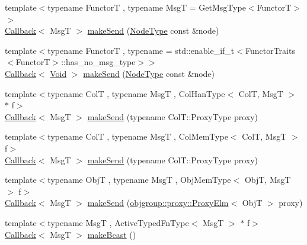 \begin{DoxyCompactItemize}
\item 
{\footnotesize template$<$typename FunctorT , typename MsgT  = Get\+Msg\+Type$<$\+Functor\+T$>$$>$ }\\\hyperlink{namespacevt_a36db99df4c973d48b1118a293fff533f}{Callback}$<$ MsgT $>$ \hyperlink{structvt_1_1pipe_1_1_pipe_manager_a0fc60c66ec9c02e2c1874e08194cac44}{make\+Send} (\hyperlink{namespacevt_a866da9d0efc19c0a1ce79e9e492f47e2}{Node\+Type} const \&node)
\item 
{\footnotesize template$<$typename FunctorT , typename  = std\+::enable\+\_\+if\+\_\+t$<$\+Functor\+Traits$<$\+Functor\+T$>$\+::has\+\_\+no\+\_\+msg\+\_\+type$>$$>$ }\\\hyperlink{namespacevt_a36db99df4c973d48b1118a293fff533f}{Callback}$<$ \hyperlink{structvt_1_1pipe_1_1_pipe_manager_ab720c2580ecfd3ab36e49aeaaff64cc6}{Void} $>$ \hyperlink{structvt_1_1pipe_1_1_pipe_manager_a89f95b27b13c69f2fe84dc29fd604082}{make\+Send} (\hyperlink{namespacevt_a866da9d0efc19c0a1ce79e9e492f47e2}{Node\+Type} const \&node)
\item 
{\footnotesize template$<$typename ColT , typename MsgT , Col\+Han\+Type$<$ Col\+T, Msg\+T $>$ $\ast$ f$>$ }\\\hyperlink{namespacevt_a36db99df4c973d48b1118a293fff533f}{Callback}$<$ MsgT $>$ \hyperlink{structvt_1_1pipe_1_1_pipe_manager_a612b59953b949edc575577e313e3b187}{make\+Send} (typename Col\+T\+::\+Proxy\+Type proxy)
\item 
{\footnotesize template$<$typename ColT , typename MsgT , Col\+Mem\+Type$<$ Col\+T, Msg\+T $>$ f$>$ }\\\hyperlink{namespacevt_a36db99df4c973d48b1118a293fff533f}{Callback}$<$ MsgT $>$ \hyperlink{structvt_1_1pipe_1_1_pipe_manager_a87e25e6a0151c0a9a48b58e6f4679b02}{make\+Send} (typename Col\+T\+::\+Proxy\+Type proxy)
\item 
{\footnotesize template$<$typename ObjT , typename MsgT , Obj\+Mem\+Type$<$ Obj\+T, Msg\+T $>$ f$>$ }\\\hyperlink{namespacevt_a36db99df4c973d48b1118a293fff533f}{Callback}$<$ MsgT $>$ \hyperlink{structvt_1_1pipe_1_1_pipe_manager_aa5d48a3b64820bec240a6a61bdfb4524}{make\+Send} (\hyperlink{structvt_1_1objgroup_1_1proxy_1_1_proxy_elm}{objgroup\+::proxy\+::\+Proxy\+Elm}$<$ ObjT $>$ proxy)
\item 
{\footnotesize template$<$typename MsgT , Active\+Typed\+Fn\+Type$<$ Msg\+T $>$ $\ast$ f$>$ }\\\hyperlink{namespacevt_a36db99df4c973d48b1118a293fff533f}{Callback}$<$ MsgT $>$ \hyperlink{structvt_1_1pipe_1_1_pipe_manager_a2ea6bd5ea3e001662681b1e5a1971e9d}{make\+Bcast} ()

\end{DoxyCompactItemize}
